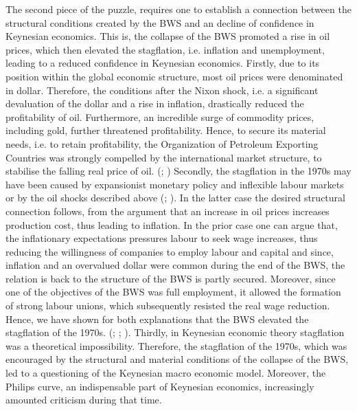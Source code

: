 \documentclass[11pt]{article}
\begin{document}
The second piece of the puzzle, requires one to establish a connection between the structural conditions created by the BWS and an decline of confidence in Keynesian economics. This is, the collapse of the BWS promoted a rise in oil prices, which then elevated the stagflation, i.e. inflation and unemployment, leading to a reduced confidence in Keynesian economics.
Firstly, due to its position within the global economic structure, most oil prices were denominated in dollar. Therefore, the conditions after the Nixon shock, i.e. a significant devaluation of the dollar and a rise in inflation, drastically reduced the profitability of oil. Furthermore, an incredible surge of commodity prices, including gold, further threatened profitability. Hence, to secure its material needs, i.e. to retain profitability, the Organization of Petroleum Exporting Countries was strongly compelled by the international market structure, to stabilise the falling real price of oil.
(\cite[p.~231]{BeaudMichel1983Ahoc}; \cite{hammes2005black})
Secondly, the stagflation in the 1970s may have been caused by expansionist monetary policy and inflexible labour markets or by the oil shocks described above (\cite{hunt2006oil,barsky2001we}; \cite[p.~192]{OlsonMancur1982Trad}). In the latter case the desired structural connection follows, from the argument that an increase in oil prices increases production cost, thus leading to inflation. In the prior case one can argue that, the inflationary expectations pressures labour to seek wage increases, thus reducing the willingness of companies to employ labour and capital and since, inflation and an overvalued dollar were common during the end of the BWS, the relation is back to the structure of the BWS is partly secured.
Moreover, since one of the objectives of the BWS was full employment, it allowed the formation of strong labour unions, which subsequently resisted the real wage reduction. Hence, we have shown for both explanations that the BWS elevated the stagflation of the 1970s. (\cite[p.~214]{JonesDanielStedman2014Motu}; \cite[p.~224]{BeaudMichel1983Ahoc}; \cite{KlimiukZbigniew2016TPaO}). 
Thirdly, in Keynesian economic theory stagflation was a theoretical impossibility. Therefore, the stagflation of the 1970s, which was encouraged by the structural and material conditions of the collapse of the BWS, led to a questioning of the Keynesian macro economic model. Moreover, the Philips curve, an indispensable part of Keynesian economics, increasingly amounted criticism during that time. 
\end{document}
